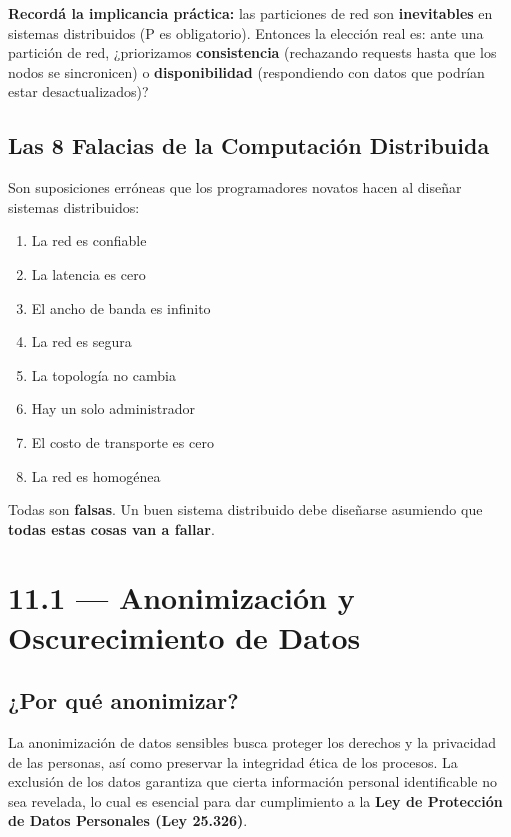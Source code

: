 \documentclass[11pt, a4paper]{article}
\begin{document}
\begin{recallbox}
	\textbf{Recordá la implicancia práctica:} las particiones de red son \textbf{inevitables} en sistemas distribuidos (P es obligatorio). Entonces la elección real es: ante una partición de red, ¿priorizamos \textbf{consistencia} (rechazando requests hasta que los nodos se sincronicen) o \textbf{disponibilidad} (respondiendo con datos que podrían estar desactualizados)?
\end{recallbox}

\subsection{Las 8 Falacias de la Computación Distribuida}

Son suposiciones erróneas que los programadores novatos hacen al diseñar sistemas distribuidos:

\begin{enumerate}
	\item La red es confiable
	\item La latencia es cero
	\item El ancho de banda es infinito
	\item La red es segura
	\item La topología no cambia
	\item Hay un solo administrador
	\item El costo de transporte es cero
	\item La red es homogénea
\end{enumerate}

Todas son \textbf{falsas}. Un buen sistema distribuido debe diseñarse asumiendo que \textbf{todas estas cosas van a fallar}.

\section{11.1 — Anonimización y Oscurecimiento de Datos}

\subsection{¿Por qué anonimizar?}

La anonimización de datos sensibles busca proteger los derechos y la privacidad de las personas, así como preservar la integridad ética de los procesos. La exclusión de los datos garantiza que cierta información personal identificable no sea revelada, lo cual es esencial para dar cumplimiento a la \textbf{Ley de Protección de Datos Personales (Ley 25.326)}.
\end{document}
